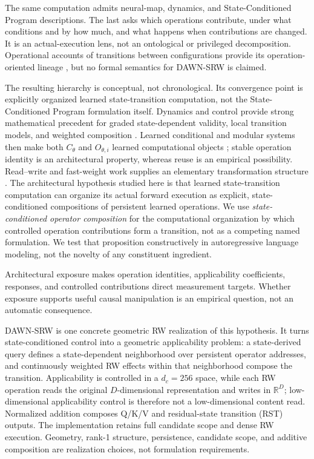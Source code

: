 \documentclass{article}
\newcommand{\R}{\mathbb{R}}
\newcommand{\DAWN}{DAWN-SRW}
\begin{document}
The same computation admits neural-map, dynamics, and State-Conditioned Program
descriptions. The last asks which operations contribute, under what conditions
and by how much, and what happens when contributions are changed. It is an
actual-execution lens, not an ontological or privileged decomposition.
Operational accounts of transitions between configurations provide its
operation-oriented lineage \cite{plotkin1981structural}, but no formal semantics
for \DAWN{} is claimed.

The resulting hierarchy is conceptual, not chronological. Its convergence point
is explicitly organized learned state-transition computation, not the
State-Conditioned Program formulation itself. Dynamics and control provide strong
mathematical precedent for graded state-dependent validity, local transition
models, and weighted composition
\cite{zadeh1965fuzzy,takagi1985fuzzy,johansen1995identification,
rugh2000research}. Learned conditional and modular systems then make both
\(C_\theta\) and \(O_{\theta,i}\) learned computational objects
\cite{shazeer2017outrageously,rosenbaum2018routing,goyal2021rim,
rahaman2021dynamic}; stable operation identity is an architectural property,
whereas reuse is an empirical possibility. Read--write and fast-weight work
supplies an elementary transformation structure
\cite{schlag2021linear,lu2026little}. The architectural hypothesis studied here
is that learned state-transition computation can organize its actual forward
execution as explicit, state-conditioned compositions of persistent learned
operations. We use \emph{state-conditioned operator composition} for the
computational organization by which controlled operation contributions form a
transition, not as a competing named formulation. We test that proposition
constructively in autoregressive language modeling, not the novelty of any
constituent ingredient.

Architectural exposure makes operation identities, applicability coefficients,
responses, and controlled contributions direct measurement targets. Whether
exposure supports useful causal manipulation is an empirical question, not an
automatic consequence.

\DAWN{} is one concrete geometric RW realization of this hypothesis. It turns
state-conditioned control into a geometric applicability problem: a state-derived
query defines a state-dependent neighborhood over persistent operator addresses,
and continuously weighted RW effects within that neighborhood compose the
transition. Applicability is controlled in a \(d_c=256\) space, while each RW
operation reads the original \(D\)-dimensional representation and writes in
\(\R^D\); low-dimensional applicability control is therefore not a
low-dimensional content read. Normalized addition composes Q/K/V and residual-state
transition (RST) outputs. The implementation retains full candidate scope and
dense RW execution. Geometry, rank-1 structure, persistence, candidate scope,
and additive composition are realization choices, not formulation requirements.
\end{document}
